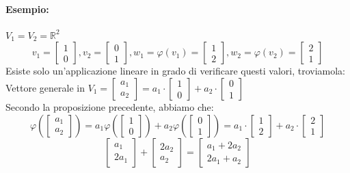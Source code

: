 \documentclass[12pt,a4paper]{article}
\begin{document}
\paragraph{Esempio:} $V_1 = V_2 = \mathbb{R}^2$
\[
v_1 = \begin{bmatrix}
  1\\
  0
\end{bmatrix}, v_2 = \begin{bmatrix}
  0\\
  1
\end{bmatrix}, w_1 = \varphi(v_1) = \begin{bmatrix}
  1\\
  2
\end{bmatrix}, w_2 = \varphi(v_2) = \begin{bmatrix}
  2\\
  1
\end{bmatrix}
\]
Esiste solo un'applicazione lineare in grado di verificare questi valori, troviamola:\\
Vettore generale in $V_1 = \begin{bmatrix}
  a_1\\
  a_2
\end{bmatrix} = a_1 \cdot \begin{bmatrix}
  1\\
  0
\end{bmatrix} + a_2 \cdot \begin{bmatrix}
  0\\
  1
\end{bmatrix}$\\
Secondo la proposizione precedente, abbiamo che:
\[
\varphi(\begin{bmatrix}
  a_1\\
  a_2
\end{bmatrix}) = a_1\varphi(\begin{bmatrix}
  1\\
  0
\end{bmatrix}) + a_2\varphi(\begin{bmatrix}
  0\\
  1
\end{bmatrix}) = a_1 \cdot \begin{bmatrix}
  1\\
  2
\end{bmatrix} + a_2 \cdot \begin{bmatrix}
  2\\
  1
\end{bmatrix}
\] 
\[
\begin{bmatrix}
  a_1\\
  2a_1
\end{bmatrix} + \begin{bmatrix}
  2a_2\\
  a_2
\end{bmatrix} = \begin{bmatrix}
  a_1 + 2a_2\\
  2a_1 + a_2
\end{bmatrix}
\]
\end{document}
